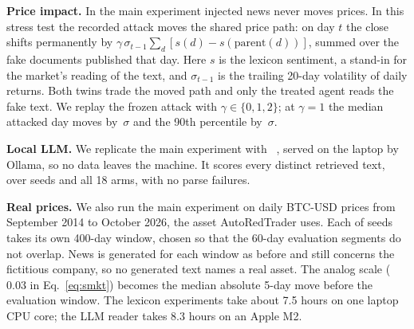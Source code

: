 \textbf{Price impact.} In the main experiment injected news never moves prices. In this stress test the recorded attack moves the shared price path: on day $t$ the close shifts permanently by $\gamma\,\sigma_{t-1}\sum_{d}[s(d)-s(\mathrm{parent}(d))]$, summed over the fake documents published that day. Here $s$ is the lexicon sentiment, a stand-in for the market's reading of the text, and $\sigma_{t-1}$ is the trailing 20-day volatility of daily returns. Both twins trade the moved path and only the treated agent reads the fake text. We replay the frozen attack with $\gamma\in\{0,1,2\}$; at $\gamma=1$ the median attacked day moves by $\,\sigma$ and the 90th percentile by $\,\sigma$.

\textbf{Local LLM.} We replicate the main experiment with \texttt{}~\cite{qwen2024qwen25}, served on the laptop by Ollama, so no data leaves the machine. It scores every distinct retrieved text,  over  seeds and all 18 arms, with no parse failures.

\textbf{Real prices.} We also run the main experiment on daily BTC-USD prices from September 2014 to October 2026, the asset AutoRedTrader uses. Each of  seeds takes its own 400-day window, chosen so that the 60-day evaluation segments do not overlap. News is generated for each window as before and still concerns the fictitious company, so no generated text names a real asset. The analog scale ($0.03$ in Eq.~\eqref{eq:smkt}) becomes the median absolute 5-day move before the evaluation window. The lexicon experiments take about 7.5 hours on one laptop CPU core; the LLM reader takes 8.3 hours on an Apple M2.
